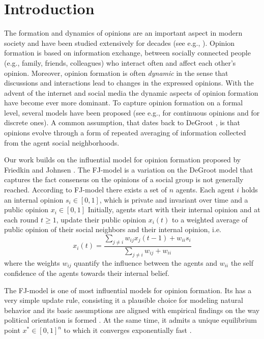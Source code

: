 \section{Introduction}
The formation and dynamics of opinions are an important aspect in modern
society and have been studied extensively for decades (see e.g., \cite{Jackson}).
Opinion formation is based on information exchange, between socially
connected people (e.g., family, friends, colleagues) who interact often
and affect each other's opinion. Moreover, opinion
formation is often \emph{dynamic} in the sense that discussions and
interactions lead to changes in the expressed opinions. With the
advent of the internet and social media the dynamic aspects of
opinion formation have become ever more dominant. To capture opinion formation
on a formal level, several models have been proposed
(see e.g., \cite{DeGroot,FJ90,HK,BKO11,GS14,BGM13} for
continuous opinions and \cite{FGV12,YOASS13,BFM16} for discrete ones).
A common assumption, that dates back to DeGroot \cite{DeGroot}, is
that opinions evolve through a form of repeated averaging of
information collected from the agent social neighborhoods.

Our work builds on the influential model for opinion formation
proposed by Friedkin and Johnsen \cite{FJ90}.
The FJ-model is a variation on the DeGroot model
that captures the fact consensus on the opinions
of a social group is not generally reached.
According to FJ-model there exists a set of $n$ agents.
Each agent $i$ holds an internal opinion $s_i\in [0,1]$, which is private and
invariant over time and a public opinion $x_i \in [0,1]$
Initially, agents start with their internal opinion and at
each round $t\geq1$, update their public opinion
$x_i(t)$ to a weighted average of public opinion of
their social neighbors and their internal opinion, i.e.
%
\begin{equation}\label{eq:FJ_model}
  x_i(t)= \frac{\sum_{j\neq i}w_{ij}x_j(t-1)
    + w_{ii}s_i}{\sum_{j\neq i}w_{ij}+w_{ii}}
\end{equation}
%
where the weights $w_{ij}$ quantify the influence between
the agents and $w_{ii}$ the self confidence of the agents
towards their internal belief.

The FJ-model is one of most influential models for opinion formation.
Its has a very simple update rule, consisting it a plausible choice
for modeling natural behavior and
its basic assumptions are aligned with empirical
findings on the way political orientation is formed \cite{AFH05,K47}.
At the same time, it admits a unique equilibrium point
$x^* \in [0,1]^n$ to which it converges exponentially fast \cite{GS14}.

